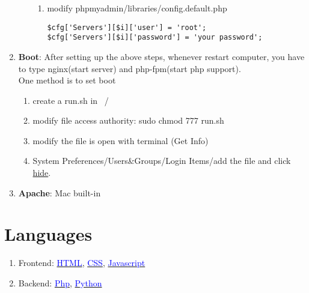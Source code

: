 \documentclass[12pt, a4paper]{report}
\begin{document}
\begin{enumerate}
\begin{enumerate}
\begin{enumerate}
                    \item modify \colorbox{gray!30}{phpmyadmin/libraries/config.default.php}
                    \begin{lstlisting}
$cfg['Servers'][$i]['user'] = 'root';
$cfg['Servers'][$i]['password'] = 'your password';
                    \end{lstlisting}
                \end{enumerate}
        \end{enumerate}
    \item \textbf{Boot}: After setting up the above steps, whenever restart computer, you have to type \colorbox{gray!30}{nginx}(start server) and \colorbox{gray!30}{php-fpm}(start php support). \\
    One method is to set boot 
        \begin{enumerate}
            \item create a run.sh in ~/
            \item modify file access authority: \colorbox{gray!30}{sudo chmod 777 run.sh}
            \item modify the file is open with terminal (Get Info)
            \item System Preferences/Users\&Groups/Login Items/add the file and click \underline{hide}.
        \end{enumerate}
        
    \item \textbf{Apache}: Mac built-in

    
\end{enumerate}


\section{Languages}
\begin{enumerate}
    \item Frontend: 
    \href{}{\textcolor{blue}{HTML}}, \href{}{\textcolor{blue}{CSS}}, \href{}{\textcolor{blue}{Javascript}}
    
    \item Backend: 
    \href{}{\textcolor{blue}{Php}}, \href{https://www.kaggle.com/muerbingsha/n-python}{\textcolor{blue}{Python}}
\end{enumerate}
\end{document}
